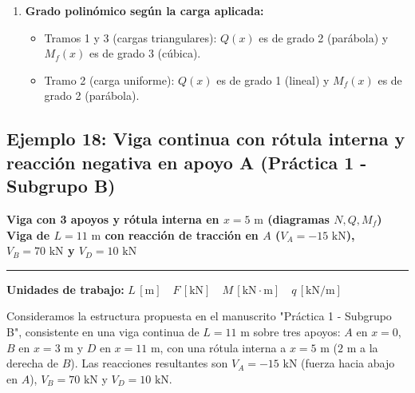 {\begin{enumerate}
        \item \textbf{Grado polinómico según la carga aplicada:}
              \begin{itemize}
                  \item Tramos 1 y 3 (cargas triangulares): $Q(x)$ es de grado 2 (parábola) y $M_f(x)$ es de grado 3 (cúbica).
                  \item Tramo 2 (carga uniforme): $Q(x)$ es de grado 1 (lineal) y $M_f(x)$ es de grado 2 (parábola).
              \end{itemize}
    \end{enumerate}
}

\subsection{Ejemplo 18: Viga continua con rótula interna y reacción negativa en apoyo A (Práctica 1 - Subgrupo B)}

\begin{tcolorbox}[colback=blue!3!white, colframe=blue!40!black, arc=3pt, boxrule=0.8pt, left=8pt, right=8pt, top=6pt, bottom=6pt]
    \centering
    {\Large\bfseries\color{blue!60!black} Viga con 3 apoyos y rótula interna en $x=5\text{ m}$ (diagramas $N, Q, M_f$)}\\[2pt]
    {\normalsize\bfseries Viga de $L = 11\text{ m}$ con reacción de tracción en $A$ ($V_A = -15\text{ kN}$), $V_B = 70\text{ kN}$ y $V_D = 10\text{ kN}$}

    \vspace{4pt}\hrule\vspace{4pt}
    {\small\textbf{Unidades de trabajo:} $L\,[\text{m}] \quad F\,[\text{kN}] \quad M\,[\text{kN}\cdot\text{m}] \quad q\,[\text{kN/m}]$}
\end{tcolorbox}


Consideramos la estructura propuesta en el manuscrito "Práctica 1 - Subgrupo B", consistente en una viga continua de $L = 11\text{ m}$ sobre tres apoyos: $A$ en $x=0$, $B$ en $x=3\text{ m}$ y $D$ en $x=11\text{ m}$, con una rótula interna a $x = 5\text{ m}$ ($2\text{ m}$ a la derecha de $B$).
Las reacciones resultantes son $V_A = -15\text{ kN}$ (fuerza hacia abajo en $A$), $V_B = 70\text{ kN}$ y $V_D = 10\text{ kN}$.

